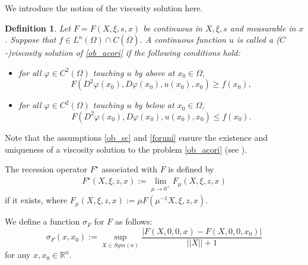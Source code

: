\documentclass[11pt, reqno]{amsart}
\newtheorem{definition}[theorem]{Definition}
\newtheorem{assumption}[theorem]{Assumption}
\numberwithin{equation}{section}
\begin{document}
We introduce the notion of the viscosity solution here. 
\begin{definition}\label{defvs} Let $F=F(X,\xi,s,x)$ be continuous in $X,\xi,s$ and measurable in $x$.
Suppose that $f \in L^{n}(\Omega )\cap C(\overline{\Omega})$.
A continuous function $u $ is called a ($C$-)viscosity solution of \eqref{ob_acori} if the following conditions hold:
\begin{itemize}
\item[(a)] for all $ \varphi \in C^{2}(\Omega) $ touching $u$ by above at $x_{0} \in \Omega$, $$F( D^{2} \varphi (x_{0}), D \varphi (x_{0}),  u(x_{0}),  x_{0}) \ge f(x_{0}) ,$$ 
\item[(b)] for all $ \varphi \in C^{2}(\Omega) $ touching $u$ by below at $x_{0} \in \Omega$, $$F( D^{2} \varphi (x_{0}), D \varphi (x_{0}),  u(x_{0}) ,x_{0}) \le f(x_{0}) .$$ 
\end{itemize}
\end{definition}
Note that the assumptions \eqref{ob_sc} and \eqref{foruni} ensure the existence and uniqueness of a viscosity solution to the problem \eqref{ob_acori} (see \cite[Theorem 4.6]{MR2486925}).

The recession operator $F^{\star}$ associated with $F$ is defined by
\begin{align} \label{fstar}F^{\star}(X,\xi,z,x):=\lim_{\mu \to 0^{+}} F_{\mu}(X,\xi,z,x)
\end{align}
if it exists, where $ F_{\mu}(X,\xi,z,x):=  \mu F( \mu^{-1}X,\xi, z,x) $.




We define a function $\sigma_{F}$ for $F$ as follows:
$$ \sigma_{F}(x,x_{0}) := \sup_{X \in Sym(n)} \frac{|F(X,0,0,x)-F(X,0,0,x_{0})|}{||X||+1}$$
for any $x, x_{0} \in \mathbb{R}^{n}$.
\end{document}
